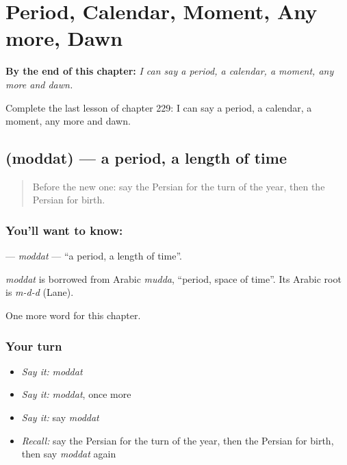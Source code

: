 
\chapter{Period, Calendar, Moment, Any more, Dawn}
\label{ch:fa-period-calendar-moment-any-more-dawn}

\begin{chapteropening}
\textbf{By the end of this chapter:} \emph{I can say a period, a calendar, a moment, any more and dawn.}

Complete the last lesson of chapter 229: I can say a period, a calendar, a moment, any more and dawn.
\end{chapteropening}

\section[\texorpdfstring{\fa{مدت} (moddat)}{مدت (moddat)}]{ (moddat) — a period, a length of time}

\label{lesson:FA-C229-moddat}



\begin{quote}
Before the new one: say the Persian for the turn of the year, then the Persian for birth.
\end{quote}

\subsection*{You'll want to know: }
\textbf{} — \emph{moddat} — \textquotedblleft{}a period, a length of time\textquotedblright{}.

\begin{cousinweb}
\emph{moddat} is borrowed from Arabic \emph{mudda}, \textquotedblleft{}period, space of time\textquotedblright{}. Its Arabic root is \emph{m-d-d} (Lane).
\end{cousinweb}

\begin{grammarlens}[title={What you've built}]
One more word for this chapter.
\end{grammarlens}

\subsection*{Your turn}
\begin{itemize}
\raggedright
  \item \emph{Say it:} \emph{moddat}
  \item \emph{Say it:} \emph{moddat}, once more
  \item \emph{Say it:} say \emph{moddat}
  \item \emph{Recall:} say the Persian for the turn of the year, then the Persian for birth, then say \emph{moddat} again
\end{itemize}


